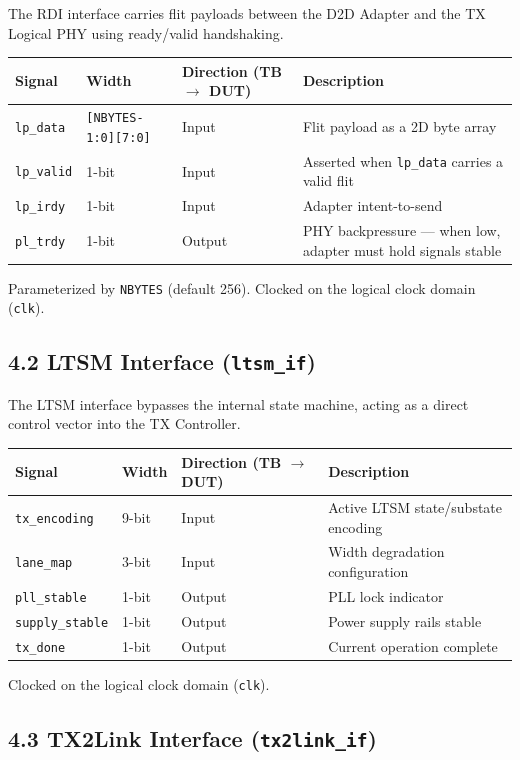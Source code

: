 \documentclass[11pt,a4paper]{article}
\begin{document}
The RDI interface carries flit payloads between the D2D Adapter and the TX Logical PHY using ready/valid handshaking.


\begin{tabularx}{\textwidth}{|X|X|X|X|}
\hline
\textbf{Signal} & \textbf{Width} & \textbf{Direction (TB $\rightarrow$ DUT)} & \textbf{Description} \\
\hline
\texttt{lp\_data} & \texttt{[NBYTES-1:0][7:0]} & Input & Flit payload as a 2D byte array \\
\hline
\texttt{lp\_valid} & 1-bit & Input & Asserted when \texttt{lp\_data} carries a valid flit \\
\hline
\texttt{lp\_irdy} & 1-bit & Input & Adapter intent-to-send \\
\hline
\texttt{pl\_trdy} & 1-bit & Output & PHY backpressure --- when low, adapter must hold signals stable \\
\hline
\end{tabularx}


Parameterized by \texttt{NBYTES} (default 256). Clocked on the logical clock domain (\texttt{clk}).

\subsection{4.2 LTSM Interface (\texttt{ltsm\_if})}

The LTSM interface bypasses the internal state machine, acting as a direct control vector into the TX Controller.


\begin{tabularx}{\textwidth}{|X|X|X|X|}
\hline
\textbf{Signal} & \textbf{Width} & \textbf{Direction (TB $\rightarrow$ DUT)} & \textbf{Description} \\
\hline
\texttt{tx\_encoding} & 9-bit & Input & Active LTSM state/substate encoding \\
\hline
\texttt{lane\_map} & 3-bit & Input & Width degradation configuration \\
\hline
\texttt{pll\_stable} & 1-bit & Output & PLL lock indicator \\
\hline
\texttt{supply\_stable} & 1-bit & Output & Power supply rails stable \\
\hline
\texttt{tx\_done} & 1-bit & Output & Current operation complete \\
\hline
\end{tabularx}


Clocked on the logical clock domain (\texttt{clk}).

\subsection{4.3 TX2Link Interface (\texttt{tx2link\_if})}
\end{document}
